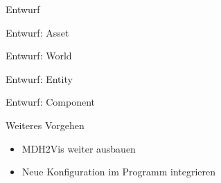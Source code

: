 \documentclass{../presentation}
\begin{document}
\begin{frame}{Entwurf}
    
\end{frame}

\begin{frame}{Entwurf: Asset}
    
\end{frame}

\begin{frame}{Entwurf: World}
    
\end{frame}

\begin{frame}{Entwurf: Entity}
    
\end{frame}

\begin{frame}{Entwurf: Component}
    
\end{frame}

\begin{frame}{Weiteres Vorgehen}
    \begin{itemize}
        \item MDH2Vis weiter ausbauen
        \item Neue Konfiguration im Programm integrieren
    \end{itemize}
\end{frame}
\end{document}

